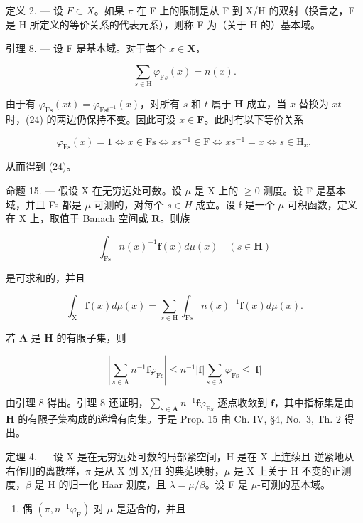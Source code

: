 定义 2. --- 设 \(F \subset X\)。如果 \(\pi\) 在 F 上的限制是从 F 到 X/H 的双射（换言之，F 是 H 所定义的等价关系的代表元系），则称 F 为（关于 H 的）基本域。

引理 8. --- 设 F 是基本域。对于每个 \(x \in \mathbf{X}\)，

\[
\sum_ {s \in \mathrm{H}} \varphi_ {\mathrm{F} s} (x) = n (x).\tag{24}
\]

由于有 \(\varphi_{\mathrm{Fs}}(xt) = \varphi_{\mathrm{Fst}^{-1}}(x)\)，对所有 \(s\) 和 \(t\) 属于 \(\mathbf{H}\) 成立，当 \(x\) 替换为 \(xt\) 时，(24) 的两边仍保持不变。因此可设 \(x \in \mathbf{F}\)。此时有以下等价关系

\[
\varphi_ {\mathrm{Fs}} (x) = 1 \Leftrightarrow x \in \mathrm{Fs} \Leftrightarrow x s ^ {- 1} \in \mathrm{F} \Leftrightarrow x s ^ {- 1} = x \Leftrightarrow s \in \mathrm{H} _ {x},
\]

从而得到 (24)。

命题 15. --- 假设 X 在无穷远处可数。设 \(\mu\) 是 X 上的 \(\geqslant 0\) 测度。设 F 是基本域，并且 Fs 都是 \(\mu\)-可测的，对每个 \(s \in H\) 成立。设 f 是一个 \(\mu\)-可积函数，定义在 X 上，取值于 Banach 空间或 \(\overline{\mathbf{R}}\)。则族

\[
\int_ {\mathrm{Fs}} n (x) ^ {- 1} \mathbf {f} (x) d \mu (x) \quad (s \in \mathbf {H})
\]

是可求和的，并且

\[
\int_ {\mathrm{X}} \mathbf {f} (x) d \mu (x) = \sum_ {s \in \mathrm{H}} \int_ {\mathrm{F} s} n (x) ^ {- 1} \mathbf {f} (x) d \mu (x).
\]

若 \(\mathbf{A}\) 是 \(\mathbf{H}\) 的有限子集，则

\[
\left| \sum_ {s \in \mathrm{A}} n ^ {- 1} \mathbf {f} \varphi_ {\mathrm{Fs}} \right| \leqslant n ^ {- 1} | \mathbf {f} | \sum_ {s \in \mathrm{A}} \varphi_ {\mathrm{Fs}} \leqslant | \mathbf {f} |
\]

由引理 8 得出。引理 8 还证明，\(\sum_{s\in\mathbf{A}}n^{-1}\mathbf{f}\varphi_{\mathrm{F}s}\) 逐点收敛到 \(\mathbf{f}\)，其中指标集是由 \(\mathbf{H}\) 的有限子集构成的递增有向集。于是 Prop. 15 由 Ch. IV, §4, No.~3, Th. 2 得出。

定理 4. --- 设 X 是在无穷远处可数的局部紧空间，H 是在 X 上连续且 逆紧地从右作用的离散群，\(\pi\) 是从 X 到 X/H 的典范映射，\(\mu\) 是 X 上关于 H 不变的正测度，\(\beta\) 是 H 的归一化 Haar 测度，且 \(\lambda = \mu/\beta\)。设 F 是 \(\mu\)-可测的基本域。

\begin{enumerate}
\def\labelenumi{\alph{enumi})}
\tightlist
\item
  偶 \((\pi, n^{-1}\varphi_{\mathrm{F}})\) 对 \(\mu\) 是适合的，并且
\end{enumerate}

